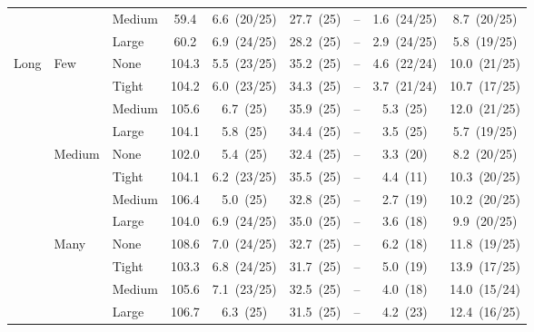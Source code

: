 \begin{table}[htbp]
{\begin{tabular}{lll c ccccc}
 &  & {\small Medium} & 59.4 & 6.6~{\scriptsize(20/25)} & 27.7~{\scriptsize(25)} & -- & 1.6~{\scriptsize(24/25)} & 8.7~{\scriptsize(20/25)} \\
 &  & {\small Large} & 60.2 & 6.9~{\scriptsize(24/25)} & 28.2~{\scriptsize(25)} & -- & 2.9~{\scriptsize(24/25)} & 5.8~{\scriptsize(19/25)} \\
\midrule
\multirow{12}{*}{\small Long} & \multirow{4}{*}{\small Few} & {\small None} & 104.3 & 5.5~{\scriptsize(23/25)} & 35.2~{\scriptsize(25)} & -- & 4.6~{\scriptsize(22/24)} & 10.0~{\scriptsize(21/25)} \\
 &  & {\small Tight} & 104.2 & 6.0~{\scriptsize(23/25)} & 34.3~{\scriptsize(25)} & -- & 3.7~{\scriptsize(21/24)} & 10.7~{\scriptsize(17/25)} \\
 &  & {\small Medium} & 105.6 & 6.7~{\scriptsize(25)} & 35.9~{\scriptsize(25)} & -- & 5.3~{\scriptsize(25)} & 12.0~{\scriptsize(21/25)} \\
 &  & {\small Large} & 104.1 & 5.8~{\scriptsize(25)} & 34.4~{\scriptsize(25)} & -- & 3.5~{\scriptsize(25)} & 5.7~{\scriptsize(19/25)} \\
 & \multirow{4}{*}{\small Medium} & {\small None} & 102.0 & 5.4~{\scriptsize(25)} & 32.4~{\scriptsize(25)} & -- & 3.3~{\scriptsize(20)} & 8.2~{\scriptsize(20/25)} \\
 &  & {\small Tight} & 104.1 & 6.2~{\scriptsize(23/25)} & 35.5~{\scriptsize(25)} & -- & 4.4~{\scriptsize(11)} & 10.3~{\scriptsize(20/25)} \\
 &  & {\small Medium} & 106.4 & 5.0~{\scriptsize(25)} & 32.8~{\scriptsize(25)} & -- & 2.7~{\scriptsize(19)} & 10.2~{\scriptsize(20/25)} \\
 &  & {\small Large} & 104.0 & 6.9~{\scriptsize(24/25)} & 35.0~{\scriptsize(25)} & -- & 3.6~{\scriptsize(18)} & 9.9~{\scriptsize(20/25)} \\
 & \multirow{4}{*}{\small Many} & {\small None} & 108.6 & 7.0~{\scriptsize(24/25)} & 32.7~{\scriptsize(25)} & -- & 6.2~{\scriptsize(18)} & 11.8~{\scriptsize(19/25)} \\
 &  & {\small Tight} & 103.3 & 6.8~{\scriptsize(24/25)} & 31.7~{\scriptsize(25)} & -- & 5.0~{\scriptsize(19)} & 13.9~{\scriptsize(17/25)} \\
 &  & {\small Medium} & 105.6 & 7.1~{\scriptsize(23/25)} & 32.5~{\scriptsize(25)} & -- & 4.0~{\scriptsize(18)} & 14.0~{\scriptsize(15/24)} \\
 &  & {\small Large} & 106.7 & 6.3~{\scriptsize(25)} & 31.5~{\scriptsize(25)} & -- & 4.2~{\scriptsize(23)} & 12.4~{\scriptsize(16/25)} \\
\bottomrule
\end{tabular}%
}
\end{table}
